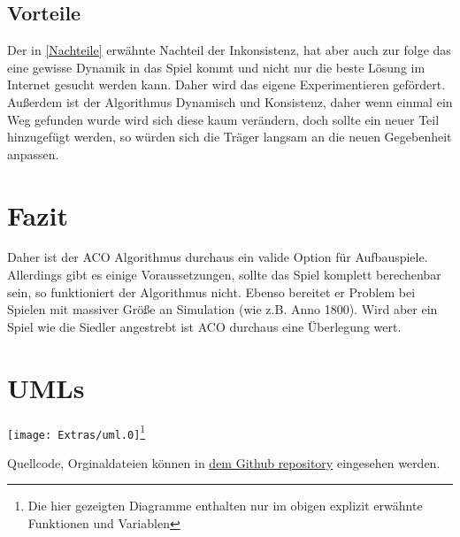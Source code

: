 \documentclass[12pt]{article}
\begin{document}
\subsection{Vorteile}
Der in \ref{Nachteile} erwähnte Nachteil der Inkonsistenz, hat aber auch zur folge das eine gewisse Dynamik in das Spiel kommt und nicht nur die beste Lösung im Internet gesucht werden kann. Daher wird das eigene Experimentieren gefördert.
Außerdem ist der Algorithmus Dynamisch und Konsistenz, daher wenn einmal ein Weg gefunden wurde wird sich diese kaum verändern, doch sollte ein neuer Teil hinzugefügt werden, so würden sich die Träger langsam an die neuen Gegebenheit anpassen.
\section{Fazit}
Daher ist der ACO Algorithmus durchaus ein valide Option für Aufbauspiele. Allerdings gibt es einige Voraussetzungen, sollte das Spiel komplett berechenbar sein, so funktioniert der Algorithmus nicht. Ebenso bereitet er Problem bei Spielen mit massiver Größe an Simulation (wie z.B. Anno 1800).
Wird aber ein Spiel wie die Siedler angestrebt ist ACO durchaus eine Überlegung wert.


\section{UMLs}
\begin{center}
\texttt{[image: Extras/uml.0]}\footnote{Die hier gezeigten Diagramme enthalten nur im obigen explizit erwähnte Funktionen und Variablen}
\end{center}
\nocite{*}
\printbibliography[heading=bibnumbered]
Quellcode, Orginaldateien können in \href{https://github.com/Kauruck/Facharbeit_AOC}{dem Github repository} eingesehen werden.
\end{document}
